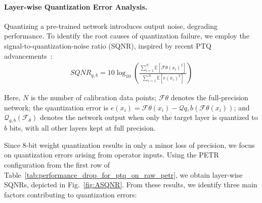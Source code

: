 \paragraph{Layer-wise Quantization Error Analysis.} Quantizing a pre-trained network introduces output noise, degrading performance. To identify the root causes of quantization failure, we employ the signal-to-quantization-noise ratio (SQNR), inspired by recent PTQ advancements~\cite{pandey2023practical, yang2023efficient, pagliari2023plinio}:
\vspace{-3mm}
\begin{equation}\label{eq:sqnr}
\begin{aligned}
SQNR_{q,b} = 10\log_{10} \left( \frac{ \sum_{i=1}^N \mathbb{E}[{\mathcal{F}}{\theta}(x_{i})^{2} ] }{ \sum_{i=1}^N \mathbb{E}[ e(x_{i})^{2} ] } \right)
\end{aligned}
\end{equation}

Here, $N$ is the number of calibration data points; $\mathcal{F}{\theta}$ denotes the full-precision network; the quantization error is $e(x_i) = \mathcal{F}{\theta}(x_i) - \mathcal{Q}{q,b}(\mathcal{F}{\theta}(x_i))$; and $\mathcal{Q}_{q,b}(\mathcal{F}_\theta)$ denotes the network output when only the target layer is quantized to $b$ bits, with all other layers kept at full precision.

Since 8-bit weight quantization results in only a minor loss of precision, we focus on quantization errors arising from operator inputs. Using the PETR configuration from the first row of Table~\ref{tab:performance_drop_for_ptq_on_raw_petr}, we obtain layer-wise SQNRs, depicted in Fig.~\ref{fig:ASQNR}. From these results, we identify three main factors contributing to quantization errors:

